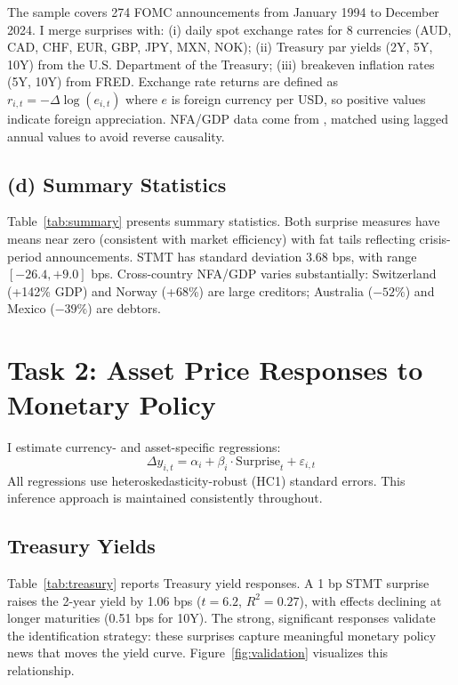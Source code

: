 \documentclass[12pt]{article}
\begin{document}
The sample covers 274 FOMC announcements from January 1994 to December 2024. I merge surprises with: (i) daily spot exchange rates for 8 currencies (AUD, CAD, CHF, EUR, GBP, JPY, MXN, NOK); (ii) Treasury par yields (2Y, 5Y, 10Y) from the U.S. Department of the Treasury; (iii) breakeven inflation rates (5Y, 10Y) from FRED. Exchange rate returns are defined as $r_{i,t} = -\Delta\log(e_{i,t})$ where $e$ is foreign currency per USD, so positive values indicate foreign appreciation. NFA/GDP data come from \citet{lane2018external}, matched using lagged annual values to avoid reverse causality.

\subsection*{(d) Summary Statistics}

Table~\ref{tab:summary} presents summary statistics. Both surprise measures have means near zero (consistent with market efficiency) with fat tails reflecting crisis-period announcements. STMT has standard deviation 3.68 bps, with range $[-26.4, +9.0]$ bps. Cross-country NFA/GDP varies substantially: Switzerland (+142\% GDP) and Norway (+68\%) are large creditors; Australia ($-52\%$) and Mexico ($-39\%$) are debtors.

\section*{Task 2: Asset Price Responses to Monetary Policy}

I estimate currency- and asset-specific regressions:
\begin{equation}
\Delta y_{i,t} = \alpha_i + \beta_i \cdot \text{Surprise}_t + \varepsilon_{i,t}
\end{equation}
All regressions use heteroskedasticity-robust (HC1) standard errors. This inference approach is maintained consistently throughout.

\subsection*{Treasury Yields}

Table~\ref{tab:treasury} reports Treasury yield responses. A 1 bp STMT surprise raises the 2-year yield by 1.06 bps ($t = 6.2$, $R^2 = 0.27$), with effects declining at longer maturities (0.51 bps for 10Y). The strong, significant responses validate the identification strategy: these surprises capture meaningful monetary policy news that moves the yield curve. Figure~\ref{fig:validation} visualizes this relationship.
\end{document}
